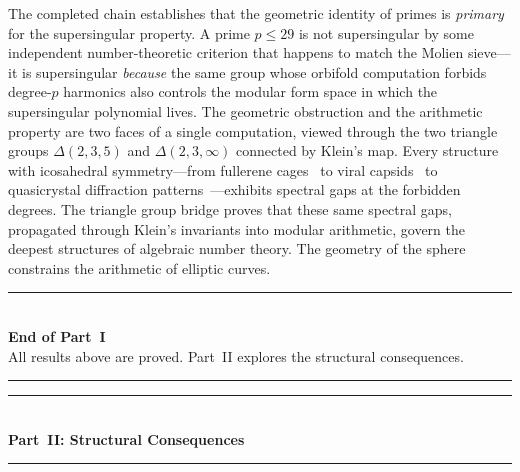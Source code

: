 \documentclass[11pt,letterpaper]{article}
\theoremstyle{definition}
\begin{document}
\begin{remarkbox}
The completed chain establishes that the geometric identity of primes is \emph{primary} for the supersingular property.  A prime $p\le 29$ is not supersingular by some independent number-theoretic criterion that happens to match the Molien sieve---it is supersingular \emph{because} the same group whose orbifold computation forbids degree-$p$ harmonics also controls the modular form space in which the supersingular polynomial lives.  The geometric obstruction and the arithmetic property are two faces of a single computation, viewed through the two triangle groups $\Delta(2,3,5)$ and $\Delta(2,3,\infty)$ connected by Klein's map.
Every structure with icosahedral symmetry---from fullerene cages~\cite{Dresselhaus1996} to viral capsids~\cite{Caspar1962} to quasicrystal diffraction patterns~\cite{Shechtman1984}---exhibits spectral gaps at the forbidden degrees.  The triangle group bridge proves that these same spectral gaps, propagated through Klein's invariants into modular arithmetic, govern the deepest structures of algebraic number theory.  The geometry of the sphere constrains the arithmetic of elliptic curves.
\end{remarkbox}
\bigskip
\begin{center}
\rule{0.6\textwidth}{0.8pt}\\[6pt]
{\large\sffamily\bfseries End of Part~I}\\[2pt]
{\small\sffamily All results above are proved.  Part~II explores the structural consequences.}\\[4pt]
\rule{0.6\textwidth}{0.8pt}
\end{center}
\bigskip
\begin{center}
\rule{0.6\textwidth}{0.8pt}\\[6pt]
{\large\sffamily\bfseries Part~II:\; Structural Consequences}\\[4pt]
\rule{0.6\textwidth}{0.8pt}
\end{center}
\medskip
\end{document}
